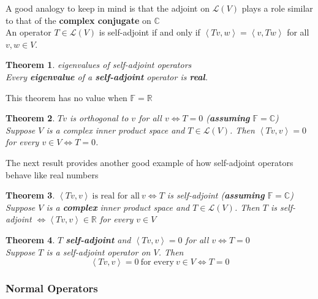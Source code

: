 \documentclass{article}
\newtheorem{theorem}{Theorem}[subsection]
\newcommand{\RR}{\mathbb{R}}
\newcommand{\CC}{\mathbb{C}}
\newcommand{\FF}{\mathbb{F}}
\begin{document}
\begin{CJK}{UTF8}{gkai}
A good analogy to keep in mind is that the adjoint on $\mathcal{L}(V)$ plays a role similar to that of the \textbf{complex conjugate} on $\CC$\\

An operator $T \in \mathcal{L}(V)$ is self-adjoint if and only if $\left<Tv,w\right> = \left<v,Tw\right>$ for all $v,w \in V$.\\

\begin{theorem}
    eigenvalues of self-adjoint operators\\

    Every \textbf{eigenvalue} of a \textbf{self-adjoint} operator is \textbf{real}.
\end{theorem}

This theorem has no value when $\FF = \RR$

\begin{theorem}
    $Tv$ is orthogonal to $v$ for all $v \Leftrightarrow T = 0$ (\textbf{assuming} $\FF = \CC$)\\

    Suppose $V$ is a complex inner product space and $T \in \mathcal{L}(V)$. Then $\left<Tv,v\right> = 0$ for every $v \in V \Leftrightarrow T = 0$.
\end{theorem}

The next result provides another good example of how self-adjoint operators behave like real numbers\\

\begin{theorem}
    $\left<Tv,v\right> ~\text{is real for all}~ v \Leftrightarrow T$ is self-adjoint (\textbf{assuming} $\FF = \CC$)\\

    Suppose $V$ is a \textbf{complex} inner product space and $T \in \mathcal{L}(V)$. Then $T$ is self-adjoint $\Leftrightarrow \left<Tv,v\right> \in \RR$ for every $v \in V$
\end{theorem}

\begin{theorem}
    $T$ \textbf{self-adjoint} and $\left<Tv,v\right> = 0$ for all $v \Leftrightarrow T = 0$\\

    Suppose $T$ is a self-adjoint operator on $V$. Then
    \[\left<Tv,v\right> = 0 ~\text{for every}~ v \in V \Leftrightarrow T = 0\]
\end{theorem}

\subsubsection{Normal Operators}


\end{CJK}
\end{document}

